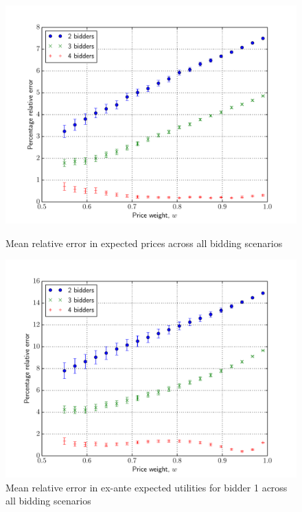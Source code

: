\begin{figure}[p!]
  \includegraphics[width=\figsize]{Approximation/Figures/compare_price}
  \caption{Mean relative error in expected prices across all bidding scenarios}
  \label{fig:compare_price_approximation}
  \vspace{10mm}
  \includegraphics[width=\figsize]{Approximation/Figures/compare_bidder_1}
  \caption{Mean relative error in ex-ante expected utilities for bidder 1 across all bidding scenarios}
  \label{fig:compare_bidder_1_approximation}
\end{figure}
